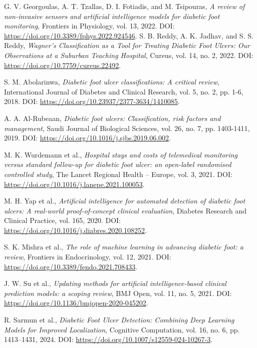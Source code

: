 \documentclass[a4paper,12pt]{report}
\newcommand{\en}{\selectlanguage{english}}
\begin{document}
\begin{thebibliography}{8}
\en 
{} 
G. V. Georgoulas, A. T. Tzallas, D. I. Fotiadis, and M. Tsipouras, 
\textit{A review of non-invasive sensors and artificial intelligence models for diabetic foot monitoring}, 
Frontiers in Physiology, vol. 13, 2022. DOI: \url{https://doi.org/10.3389/fphys.2022.924546}.
\en 
{} 
S. B. Reddy, A. K. Jadhav, and S. S. Reddy, 
\textit{Wagner's Classification as a Tool for Treating Diabetic Foot Ulcers: Our Observations at a Suburban Teaching Hospital}, 
Cureus, vol. 14, no. 2, 2022. DOI: \url{https://doi.org/10.7759/cureus.22492}.

S. M. Abolarinwa, 
\textit{Diabetic foot ulcer classifications: A critical review}, 
International Journal of Diabetes and Clinical Research, vol. 5, no. 2, pp. 1-6, 2018. DOI: \url{https://doi.org/10.23937/2377-3634/1410085}.

A. A. Al-Rubeaan, 
\textit{Diabetic foot ulcers: Classification, risk factors and management}, 
Saudi Journal of Biological Sciences, vol. 26, no. 7, pp. 1403-1411, 2019. DOI: \url{https://doi.org/10.1016/j.sjbs.2019.06.002}.

M. K. Wurdemann et al., 
\textit{Hospital stays and costs of telemedical monitoring versus standard follow-up for diabetic foot ulcer: an open-label randomised controlled study}, 
The Lancet Regional Health – Europe, vol. 3, 2021. DOI: \url{https://doi.org/10.1016/j.lanepe.2021.100053}.

M. H. Yap et al., 
\textit{Artificial intelligence for automated detection of diabetic foot ulcers: A real-world proof-of-concept clinical evaluation}, 
Diabetes Research and Clinical Practice, vol. 165, 2020. DOI: \url{https://doi.org/10.1016/j.diabres.2020.108252}.

S. K. Mishra et al., 
\textit{The role of machine learning in advancing diabetic foot: a review}, 
Frontiers in Endocrinology, vol. 12, 2021. DOI: \url{https://doi.org/10.3389/fendo.2021.708433}.

J. W. Su et al., 
\textit{Updating methods for artificial intelligence-based clinical prediction models: a scoping review}, 
BMJ Open, vol. 11, no. 5, 2021. DOI: \url{https://doi.org/10.1136/bmjopen-2020-045202}.

R. Sarmun et al., 
\textit{Diabetic Foot Ulcer Detection: Combining Deep Learning Models for Improved Localization}, 
Cognitive Computation, vol. 16, no. 6, pp. 1413--1431, 2024. DOI: \url{https://doi.org/10.1007/s12559-024-10267-3}.


\end{thebibliography}
\end{document}
